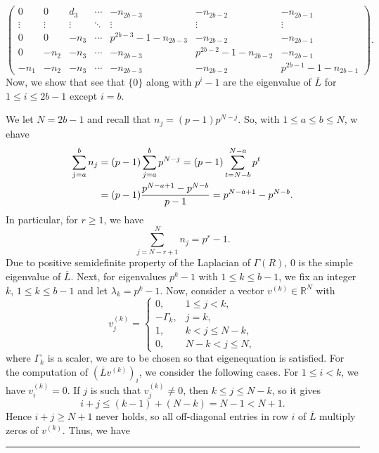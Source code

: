 \documentclass[12pt,twoside]{article}
\renewenvironment{proof}{{\noindent\bfseries Proof.}}{\qed}
\def\qed{\nolinebreak\hfill\rule{.2cm}{.2cm}\par\addvspace{.5cm}}
\begin{document}
\begin{proof}
\[\begin{pmatrix}
	0   & 0   & d_3 & \cdots & -n_{2b-3} & -n_{2b-2} & -n_{2b-1} \\[3pt]
	\vdots & \vdots & \vdots & \ddots & \vdots    & \vdots    & \vdots \\[3pt]
	0   & 0   & -n_3 & \cdots &
	p^{ 2b-3}-1-n_{2b-3} & -n_{2b-2} & -n_{2b-1} \\[3pt]
	0   & -n_2 & -n_3 & \cdots & -n_{2b-3} &
	p^{ 2b-2}-1-n_{2b-2} & -n_{2b-1} \\[3pt]
	-n_1 & -n_2 & -n_3 & \cdots & -n_{2b-3} & -n_{2b-2} &
	p^{ 2b-1}-1-n_{2b-1}
\end{pmatrix}.
\]
Now, we show that see that $\{0\}$ along with $p^{i}-1$ are the eigenvalue of $\overline{L}$ for $1\leq i\leq 2b-1$ except $i=b.$

	We let $N=2b-1$ and recall that $n_j=(p-1)p^{N-j}$. So, with 	$1\le a\le b\le N$, w ehave
	\begin{align}
		\sum_{j=a}^{b} n_j
		&= (p-1)\sum_{j=a}^{b} p^{N-j}
		= (p-1)\sum_{t=N-b}^{N-a} p^t \notag\\
		&= (p-1) \frac{p^{N-a+1}-p^{N-b}}{p-1}
		= p^{N-a+1}-p^{N-b}. \label{eq:general-sum}
	\end{align}
	In particular, for $r\ge1$, we have
	\begin{equation}\label{eq:tail-sum}
		\sum_{j=N-r+1}^{N} n_j = p^r-1.
	\end{equation}
	Due to positive semidefinite property of the Laplacian of $ \varGamma(R)$, $0$ is the simple eigenvalue of $\overline{L}$. Next, for eigenvalues $p^k-1$ with $1\le k\le b-1$, we fix an integer $k$,  $1\le k\le b-1$ and let $
	\lambda_k = p^k-1.$ Now, consider a vector  $v^{(k)}\in\mathbb{R}^N$ with 
	\begin{equation}\label{eq:v-k}
		v^{(k)}_j =
		\begin{cases}
			0, & 1\le j<k,\\
			- \varGamma_k, & j=k,\\
			1, & k<j\le N-k,\\
			0, & N-k<j\le N,
		\end{cases}
	\end{equation}
	where $ \varGamma_k$ is a scaler, we are to be chosen so that eigenequation is satisfied. For the computation of $(\overline{L}v^{(k)})_i$, we consider the following cases. For  $1\le i<k$, we have $v_i^{(k)}=0$. If $j$ is such that $v_j^{(k)}\ne0$, then 
	$k\le j\le N-k$, so it gives
	\[
	i+j\le (k-1)+(N-k) = N-1 < N+1.
	\]
	Hence $i+j\ge N+1$ never holds, so all off-diagonal entries in row $i$ of $\overline{L}$
	multiply zeros of $v^{(k)}$. Thus, we have

\end{proof}
\end{document}

